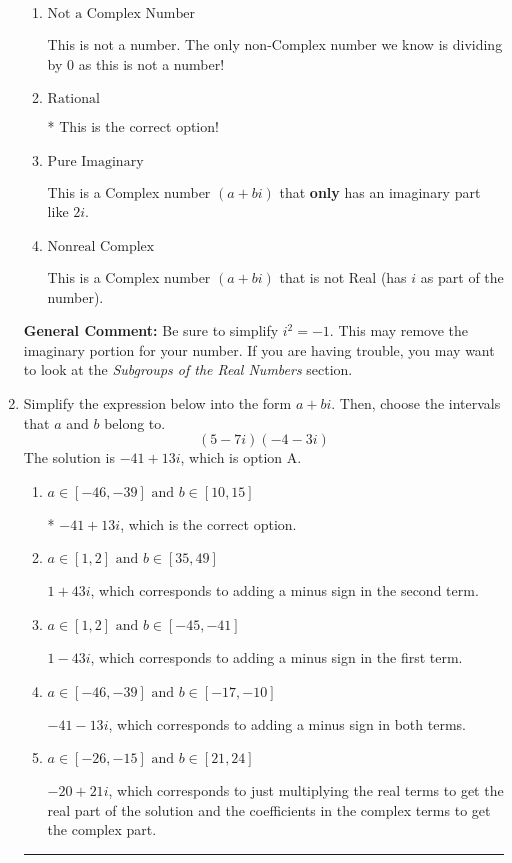 \documentclass{extbook}[14pt]
\newcommand{\litem}[1]{\item #1

\rule{\textwidth}{0.4pt}}
\begin{document}
\begin{enumerate}
{\begin{enumerate}[label=\Alph*.]
These cannot be written as a fraction of Integers. Remember: $\pi$ is not an Integer!
\item \( \text{Not a Complex Number} \)

This is not a number. The only non-Complex number we know is dividing by 0 as this is not a number!
\item \( \text{Rational} \)

* This is the correct option!
\item \( \text{Pure Imaginary} \)

This is a Complex number $(a+bi)$ that \textbf{only} has an imaginary part like $2i$.
\item \( \text{Nonreal Complex} \)

This is a Complex number $(a+bi)$ that is not Real (has $i$ as part of the number).
\end{enumerate}

\textbf{General Comment:} Be sure to simplify $i^2 = -1$. This may remove the imaginary portion for your number. If you are having trouble, you may want to look at the \textit{Subgroups of the Real Numbers} section.
}
\litem{
Simplify the expression below into the form $a+bi$. Then, choose the intervals that $a$ and $b$ belong to.
\[ (5 - 7 i)(-4 - 3 i) \]
The solution is \( -41 + 13 i \), which is option A.\begin{enumerate}[label=\Alph*.]
\item \( a \in [-46, -39] \text{ and } b \in [10, 15] \)

* $-41 + 13 i$, which is the correct option.
\item \( a \in [1, 2] \text{ and } b \in [35, 49] \)

 $1 + 43 i$, which corresponds to adding a minus sign in the second term.
\item \( a \in [1, 2] \text{ and } b \in [-45, -41] \)

 $1 - 43 i$, which corresponds to adding a minus sign in the first term.
\item \( a \in [-46, -39] \text{ and } b \in [-17, -10] \)

 $-41 - 13 i$, which corresponds to adding a minus sign in both terms.
\item \( a \in [-26, -15] \text{ and } b \in [21, 24] \)

 $-20 + 21 i$, which corresponds to just multiplying the real terms to get the real part of the solution and the coefficients in the complex terms to get the complex part.
\end{enumerate}

}
\end{enumerate}
\end{document}

